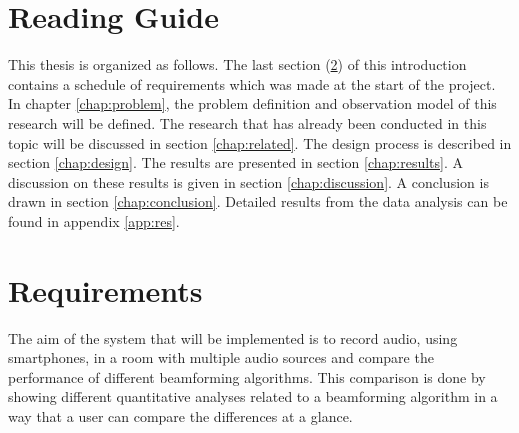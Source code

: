 \section{Reading Guide}
\label{sec:intro_reading}
This thesis is organized as follows. The last section (\ref{sec:intro_req}) of this introduction contains a schedule of requirements which was made at the start of the project. In chapter \ref{chap:problem}, the problem definition and observation model of this research will be defined. The research that has already been conducted in this topic will be discussed in section \ref{chap:related}. The design process is described in section \ref{chap:design}. The results are presented in section \ref{chap:results}. A discussion on these results is given in section \ref{chap:discussion}. A conclusion is drawn in section \ref{chap:conclusion}. Detailed results from the data analysis can be found in appendix \ref{app:res}.


\section{Requirements}
\label{sec:intro_req}
The aim of the system that will be implemented is to record audio, using smartphones, in a room with multiple audio sources and compare the performance of different beamforming algorithms. This comparison is done by showing different quantitative analyses related to a beamforming algorithm in a way that a user can compare the differences at a glance.

